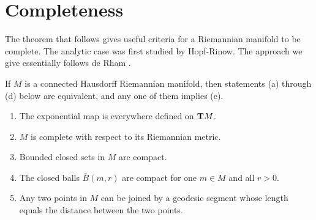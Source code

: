 \documentclass[../main]{subfiles}
\begin{document}
\section{Completeness}\label{ch10:s5}

The theorem that follows gives useful criteria for a Riemannian manifold to be complete. The analytic case was first studied by Hopf-Rinow. The approach we give essentially follows de Rham \cite{derham1952sur}.



\begin{theorem} \label{thm:ch10.5.1}
If $M$ is a connected Hausdorff Riemannian manifold, then statements (a) through (d) below are equivalent, and any one of them implies (e).
\begin{enumerate}[label=(\alph*)]

\item The exponential map is everywhere defined on $\mathbf{T}M$.

\item $M$ is complete with respect to its Riemannian metric.

\item Bounded closed sets in $M$ are compact.

\item The closed balls $\bar B(m,r)$ are compact for one $m\in M$ and all $r>0$.

\item Any two points in $M$ can be joined by a geodesic segment whose length equals the distance between the two points.

\end{enumerate}
\end{theorem}
\end{document}

